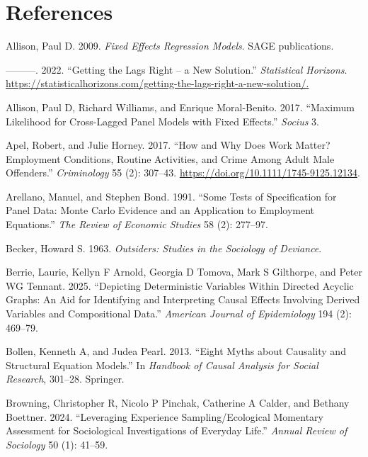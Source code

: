 \documentclass[
  letterpaper,
  DIV=11,
  numbers=noendperiod]{scrartcl}
\newlength{\cslhangindent}
\newenvironment{CSLReferences}[2] %
 {\begin{list}{}{%
  \setlength{\itemindent}{0pt}
  \setlength{\leftmargin}{0pt}
  \setlength{\parsep}{0pt}
  \ifodd #1
   \setlength{\leftmargin}{\cslhangindent}
   \setlength{\itemindent}{-1\cslhangindent}
  \fi
  \setlength{\itemsep}{#2\baselineskip}}}
 {\end{list}}
\begin{document}
\section*{References}\label{references}

\label{refs}
\begin{CSLReferences}{1}{0}
Allison, Paul D. 2009. \emph{Fixed Effects Regression Models}. SAGE
publications.

---------. 2022. {``Getting the Lags Right -- a New Solution.''}
\emph{Statistical Horizons}.
\url{https://statisticalhorizons.com/getting-the-lags-right-a-new-solution/.}

Allison, Paul D, Richard Williams, and Enrique Moral-Benito. 2017.
{``Maximum Likelihood for Cross-Lagged Panel Models with Fixed
Effects.''} \emph{Socius} 3.

Apel, Robert, and Julie Horney. 2017. {``How and Why Does Work Matter?
Employment Conditions, Routine Activities, and Crime Among Adult Male
Offenders.''} \emph{Criminology} 55 (2): 307--43.
\url{https://doi.org/10.1111/1745-9125.12134}.

Arellano, Manuel, and Stephen Bond. 1991. {``Some Tests of Specification
for Panel Data: Monte Carlo Evidence and an Application to Employment
Equations.''} \emph{The Review of Economic Studies} 58 (2): 277--97.

Becker, Howard S. 1963. \emph{Outsiders: Studies in the Sociology of
Deviance}.

Berrie, Laurie, Kellyn F Arnold, Georgia D Tomova, Mark S Gilthorpe, and
Peter WG Tennant. 2025. {``Depicting Deterministic Variables Within
Directed Acyclic Graphs: An Aid for Identifying and Interpreting Causal
Effects Involving Derived Variables and Compositional Data.''}
\emph{American Journal of Epidemiology} 194 (2): 469--79.

Bollen, Kenneth A, and Judea Pearl. 2013. {``Eight Myths about Causality
and Structural Equation Models.''} In \emph{Handbook of Causal Analysis
for Social Research}, 301--28. Springer.

Browning, Christopher R, Nicolo P Pinchak, Catherine A Calder, and
Bethany Boettner. 2024. {``Leveraging Experience Sampling/Ecological
Momentary Assessment for Sociological Investigations of Everyday
Life.''} \emph{Annual Review of Sociology} 50 (1): 41--59.


\end{CSLReferences}
\end{document}
